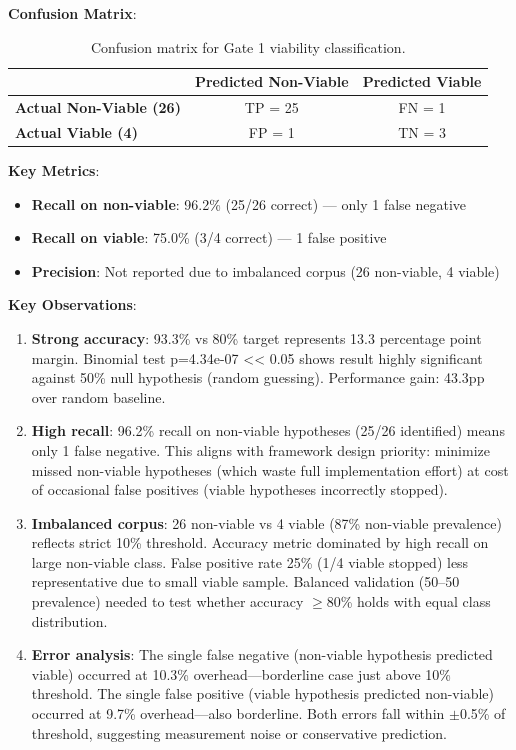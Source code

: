 \textbf{Confusion Matrix}:

\begin{table}[h]
\centering
\small
\begin{tabular}{lcc}
\toprule
 & \textbf{Predicted Non-Viable} & \textbf{Predicted Viable} \\
\midrule
\textbf{Actual Non-Viable (26)} & TP = 25 & FN = 1 \\
\textbf{Actual Viable (4)} & FP = 1 & TN = 3 \\
\bottomrule
\end{tabular}
\caption{Confusion matrix for Gate 1 viability classification.}
\label{tab:confusion_matrix}
\end{table}

\textbf{Key Metrics}:
\begin{itemize}
\item \textbf{Recall on non-viable}: 96.2\% (25/26 correct) --- only 1 false negative
\item \textbf{Recall on viable}: 75.0\% (3/4 correct) --- 1 false positive
\item \textbf{Precision}: Not reported due to imbalanced corpus (26 non-viable, 4 viable)
\end{itemize}

\textbf{Key Observations}:

\begin{enumerate}
\item \textbf{Strong accuracy}: 93.3\% vs 80\% target represents 13.3 percentage point margin. Binomial test p=4.34e-07 << 0.05 shows result highly significant against 50\% null hypothesis (random guessing). Performance gain: 43.3pp over random baseline.

\item \textbf{High recall}: 96.2\% recall on non-viable hypotheses (25/26 identified) means only 1 false negative. This aligns with framework design priority: minimize missed non-viable hypotheses (which waste full implementation effort) at cost of occasional false positives (viable hypotheses incorrectly stopped).

\item \textbf{Imbalanced corpus}: 26 non-viable vs 4 viable (87\% non-viable prevalence) reflects strict 10\% threshold. Accuracy metric dominated by high recall on large non-viable class. False positive rate 25\% (1/4 viable stopped) less representative due to small viable sample. Balanced validation (50--50 prevalence) needed to test whether accuracy $\geq$80\% holds with equal class distribution.

\item \textbf{Error analysis}: The single false negative (non-viable hypothesis predicted viable) occurred at 10.3\% overhead---borderline case just above 10\% threshold. The single false positive (viable hypothesis predicted non-viable) occurred at 9.7\% overhead---also borderline. Both errors fall within $\pm$0.5\% of threshold, suggesting measurement noise or conservative prediction.
\end{enumerate}

